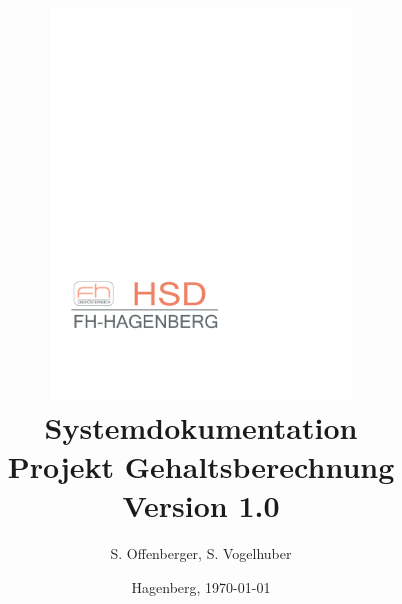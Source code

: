 \documentclass[12pt,naustrian,a4widepaper]{scrartcl}
\begin{document}



\title {\vspace{1cm}
       \includegraphics[width=8cm]{./Images/FhOOeLogoOkt2009_HSD_Rot_pastell}\\
       \vspace{2cm}
       {\textbf{Systemdokumentation\\Projekt Gehaltsberechnung}}\\
       \vspace{5mm}
       {\small{Version 1.0}}\\
       \vspace{5mm}
}

\author{\small{S. Offenberger, S. Vogelhuber}}
\date  {\small{Hagenberg, \today}}
\maketitle


\clearpage

\tableofcontents
\clearpage
\end{document}
